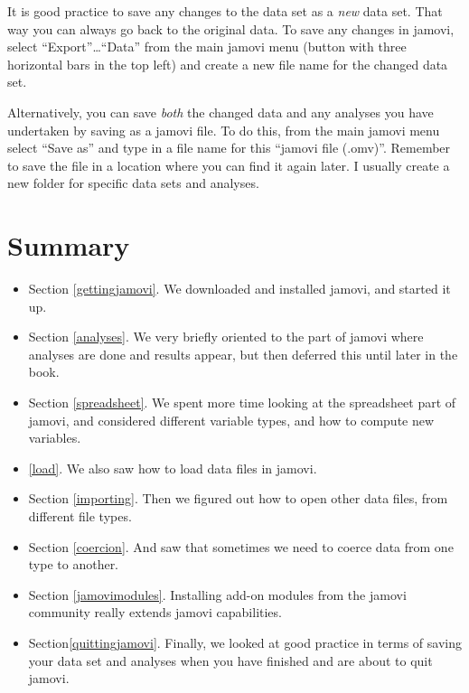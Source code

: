\documentclass[
]{book}
\providecommand{\tightlist}{%
  \setlength{\itemsep}{0pt}\setlength{\parskip}{0pt}}
\begin{document}
It is good practice to save any changes to the data set as a \emph{new} data set. That way you can always go back to the original data. To save any changes in jamovi, select ``Export''\ldots{}``Data'' from the main jamovi menu (button with three horizontal bars in the top left) and create a new file name for the changed data set.

Alternatively, you can save \emph{both} the changed data and any analyses you have undertaken by saving as a jamovi file. To do this, from the main jamovi menu select ``Save as'' and type in a file name for this ``jamovi file (.omv)''. Remember to save the file in a location where you can find it again later. I usually create a new folder for specific data sets and analyses.

\hypertarget{summary-1}{%
\section{Summary}\label{summary-1}}

\begin{itemize}
\tightlist
\item
  Section \ref{gettingjamovi}. We downloaded and installed jamovi, and started it up.
\item
  Section \ref{analyses}. We very briefly oriented to the part of jamovi where analyses are done and results appear, but then deferred this until later in the book.
\item
  Section \ref{spreadsheet}. We spent more time looking at the spreadsheet part of jamovi, and considered different variable types, and how to compute new variables.
\item
  \ref{load}. We also saw how to load data files in jamovi.
\item
  Section \ref{importing}. Then we figured out how to open other data files, from different file types.
\item
  Section \ref{coercion}. And saw that sometimes we need to coerce data from one type to another.
\item
  Section \ref{jamovimodules}. Installing add-on modules from the jamovi community really extends jamovi capabilities.
\item
  Section\ref{quittingjamovi}. Finally, we looked at good practice in terms of saving your data set and analyses when you have finished and are about to quit jamovi.
\end{itemize}

  
\end{document}
